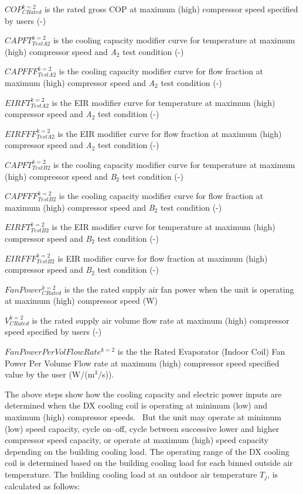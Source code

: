 \(COP_{CRated}^{k = 2}\) is the rated gross COP at maximum (high) compressor speed specified by users (-)

\(CAPFT_{TestA2}^{k = 2}\) is the cooling capacity modifier curve for temperature at maximum (high) compressor speed and \emph{A}\(_{2}\) test condition (-)

\(CAPFFF_{TestA2}^{k = 2}\) is the cooling capacity modifier curve for flow fraction at maximum (high) compressor speed and \emph{A}\(_{2}\) test condition (-)

\(EIRFT_{TestA2}^{k = 2}\) is the EIR modifier curve for temperature at maximum (high) compressor speed and \emph{A}\(_{2}\) test condition (-)

\(EIRFFF_{TestA2}^{k = 2}\) is the EIR modifier curve for flow fraction at maximum (high)~ compressor speed and \emph{A}\(_{2}\) test condition (-)

\(CAPFT_{TestB2}^{k = 2}\) is the cooling capacity modifier curve for temperature at maximum (high) compressor speed and \emph{B}\(_{2}\) test condition (-)

\(CAPFFF_{TestB2}^{k = 2}\) is the cooling capacity modifier curve for flow fraction at maximum (high) compressor speed and \emph{B}\(_{2}\) test condition (-)

\(EIRFT_{TestB2}^{k = 2}\) is the EIR modifier curve for temperature at maximum (high) compressor speed and \emph{B}\(_{2}\) test condition (-)

\(EIRFFF_{TestB2}^{k = 2}\) is EIR modifier curve for flow fraction at maximum (high) compressor speed and \emph{B}\(_{2}\) test condition (-)

\(FanPower_{CRated}^{k = 2}\) is the the rated supply air fan power when the unit is operating at maximum (high) compressor speed (W)

\(V_{CRated}^{k = 2}\) is the rated supply air volume flow rate at maximum (high) compressor speed specified by users (-)

\(FanPowerPerVolFlowRat{e^{k = 2}}\) is the the Rated Evaporator (Indoor Coil) Fan Power Per Volume Flow rate at maximum (high) compressor speed specified value by the user (W/(m\(^3\)/s)).

The above steps show how the cooling capacity and electric power inputs are determined when the DX cooling coil is operating at minimum (low) and maximum (high) compressor speeds.~ But the unit may operate at minimum (low) speed capacity, cycle on--off, cycle between successive lower and higher compressor speed capacity, or operate at maximum (high) speed capacity depending on the building cooling load. The operating range of the DX cooling coil is determined based on the building cooling load for each binned outside air temperature. The building cooling load at an outdoor air temperature \(T_{j}\), is calculated as follows:

